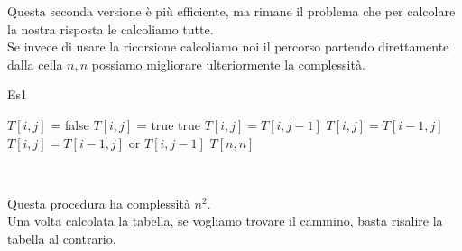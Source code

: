 Questa seconda versione è più efficiente, ma rimane il problema che per calcolare la nostra risposta le calcoliamo tutte. \\
Se invece di usare la ricorsione calcoliamo noi il percorso partendo direttamente dalla cella $n,n$ possiamo migliorare ulteriormente la complessità.
\begin{algorithm}
	\caption{Es1}\label{alg:es1-sim-3}
	\begin{algorithmic}[1]
						\State $T[i,j]$ = false
						\State $T[i,j]$ = true
					\State \Return true
						\State $T[i,j] = T[i,j-1]$
						\State $T[i,j] = T[i-1,j]$
					\Else
						\State $T[i,j] = T[i-1,j]$ or $T[i,j-1]$
					\EndIf
				\EndFor
			\EndFor
			\State \Return $T[n,n]$
		\EndFunction
	\end{algorithmic}
\end{algorithm} \\ \hfill

Questa procedura ha complessità $n^2$. \\
Una volta calcolata la tabella, se vogliamo trovare il cammino, basta risalire la tabella al contrario. \\